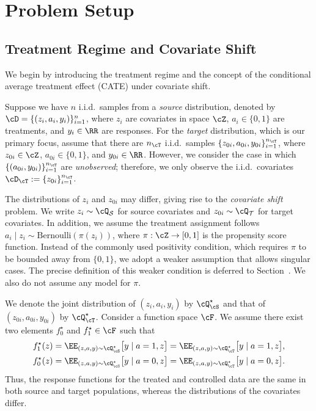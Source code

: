 \documentclass[12pt,a4paper,pdftex,onepage]{article}
\begin{document}
\section{Problem Setup}\label{section; problem setup}

\subsection{Treatment Regime and Covariate Shift}\label{sec-setup-1}
We begin by introducing the treatment regime and the concept of the conditional average treatment effect (CATE) under covariate shift.  

Suppose we have \(n\) i.i.d.\ samples from a \emph{source} distribution, denoted by \(\cD = \{(z_i, a_i, y_i)\}_{i=1}^n\), where \(z_i \) are covariates in space \(\cZ\), \(a_i \in \{0,1\}\) are treatments, and \(y_i \in \RR\) are responses.  
For the \emph{target} distribution, which is our primary focus, assume that there are \(n_\cT\) i.i.d.\ samples \(\{z_{0i}, a_{0i}, y_{0i}\}_{i=1}^{n_\cT}\), where \(z_{0i} \in \cZ\), \(a_{0i} \in \{0,1\}\), and \(y_{0i} \in \RR\).  
However, we consider the case in which \(\{(a_{0i}, y_{0i})\}_{i=1}^{n_\cT}\) are \emph{unobserved}; therefore, we only observe the i.i.d.\ covariates \(\cD_{\cT} := \{z_{0i}\}_{i=1}^{n_\cT}\). 

The distributions of \(z_i\) and \(z_{0i}\) may differ, giving rise to the \emph{covariate shift} problem.  
We write \(z_i \sim \cQ_{\mathcal{S}}\) for source covariates and \(z_{0i} \sim \cQ_{\mathcal{T}}\) for target covariates.  
In addition, we assume the treatment assignment follows \(a_i \mid z_i \sim \mathrm{Bernoulli}(\pi(z_i))\), where \(\pi: \cZ \to [0,1]\) is the propensity score function.  
Instead of the commonly used positivity condition, which requires \(\pi\) to be bounded away from \(\{0,1\}\), we adopt a weaker assumption that allows singular cases.  
The precise definition of this weaker condition is deferred to Section~.  
We also do not assume any model for \(\pi\).

We denote the joint distribution of \((z_i, a_i, y_i)\) by \(\cQ_\cS^\star\) and that of \((z_{0i}, a_{0i}, y_{0i})\) by \(\cQ_\cT^\star\).  
Consider a function space \(\cF\).  
We assume there exist two elements \(f_0^\star\) and \(f_1^\star \in \cF\) such that
\begin{align*}
f_{1}^\star(z) &= \EE_{(z,a,y)\sim \cQ_\cS^\star}\bigl[y \mid a=1, z\bigr] 
= \EE_{(z,a,y)\sim \cQ_\cT^\star}\bigl[y \mid a=1, z\bigr],\\
f_{0}^\star(z) &= \EE_{(z,a,y)\sim \cQ_\cS^\star}\bigl[y \mid a=0, z\bigr]
= \EE_{(z,a,y)\sim \cQ_\cT^\star}\bigl[y \mid a=0, z\bigr].
\end{align*}
Thus, the response functions for the treated and controlled data are the same in both source and target populations, whereas the distributions of the covariates differ.
\end{document}
